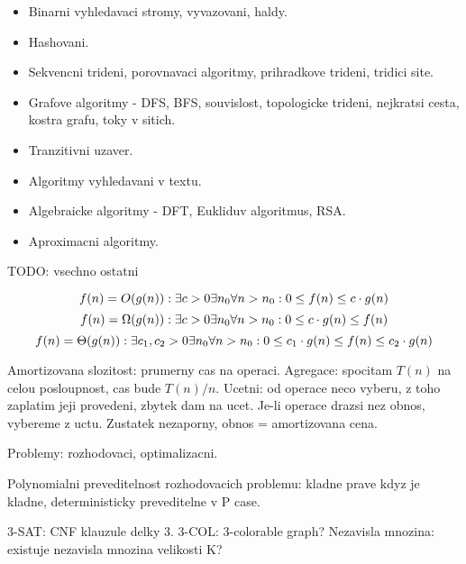 \begin{itemize}
\item Binarni vyhledavaci stromy, vyvazovani, haldy.
\item Hashovani.
\item Sekvencni trideni, porovnavaci algoritmy, prihradkove trideni, tridici site.
\item Grafove algoritmy - DFS, BFS, souvislost, topologicke trideni, nejkratsi cesta, kostra grafu, toky v sitich.
\item Tranzitivni uzaver.
\item Algoritmy vyhledavani v textu.
\item Algebraicke algoritmy - DFT, Eukliduv algoritmus, RSA.
\item Aproximacni algoritmy.
\end{itemize}

TODO: vsechno ostatni

\begin{understood}
$$f(n)=O(g(n)): \exists c>0 \exists n_0 \forall n>n_0: 0\leq f(n)\leq c\cdot g(n)$$
$$f(n)=\Omega(g(n)): \exists c>0 \exists n_0 \forall n>n_0: 0\leq c\cdot g(n)\leq f(n)$$
$$f(n)=\Theta(g(n)): \exists c_1,c_2>0 \exists n_0 \forall n>n_0: 0\leq c_1\cdot g(n)\leq
f(n)\leq c_2\cdot g(n)$$
\end{understood}

Amortizovana slozitost: prumerny cas na operaci. Agregace: spocitam $T(n)$ na
celou posloupnost, cas bude $T(n)/n$.
Ucetni: od operace neco vyberu, z toho zaplatim jeji provedeni, zbytek dam na
ucet. Je-li operace drazsi nez obnos, vybereme z uctu. Zustatek nezaporny, obnos
= amortizovana cena.

Problemy: rozhodovaci, optimalizacni.
\begin{understood}
Polynomialni preveditelnost rozhodovacich problemu: kladne prave kdyz je kladne,
deterministicky preveditelne v P case.
\end{understood}

3-SAT: CNF klauzule delky 3.
3-COL: 3-colorable graph?
Nezavisla mnozina: existuje nezavisla mnozina velikosti K?

